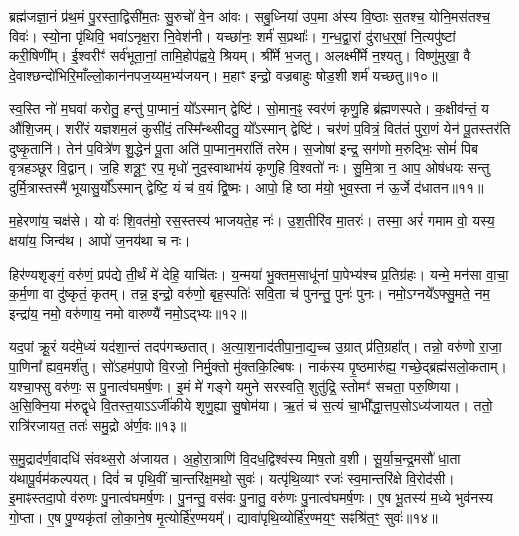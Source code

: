 ब्रह्म॑जज्ञा॒नं प्र॑थ॒मं पु॒रस्ता॒द्विसी॑म॒तः सु॒रुचो॑ वे॒न आ॑वः। 
सबु॒ध्निया॑ उप॒मा अ॑स्य वि॒ष्ठाः स॒तश्च॒ योनि॒मस॑तश्च॒ विवः॑। 
स्यो॒ना पृ॑थिवि॒ भवा॑ऽनृक्ष॒रा नि॒वेश॑नी। 
यच्छा॑नः॒ शर्म॑ स॒प्रथाः᳚। 
ग॒न्ध॒द्वा॒रां दु॑राध॒र्॒‌षां॒ नि॒त्यपु॑ष्टां करी॒षिणी᳚म्। 
ई॒श्वरीꣳ॑ सर्व॑भूता॒नां॒ तामि॒होप॑ह्वये॒ श्रियम्। 
श्री᳚र्मे भ॒जतु। 
अलक्ष्मी᳚र्मे न॒श्यतु। 
विष्णु॑मुखा॒ वै दे॒वाश्छन्दो॑भिरि॒माँल्लो॒कान॑नप\-ज॒य्यम॒भ्य॑जयन्। 
म॒हाꣳ इन्द्रो॒ वज्रबाहुः षोड॒शी शर्म॑ यच्छतु॥१०॥

 स्व॒स्ति नो॑ म॒घवा॑ करोतु॒ हन्तु॑ पा॒प्मानं॒ यो᳚ऽस्मान् द्वेष्टि॑। 
 सो॒मान॒ꣴ॒ स्वर॑णं कृणु॒हि ब्र॑ह्मणस्पते। 
 क॒क्षीव॑न्तं॒ य औ॑शि॒जम्। 
 शरी॑रं यज्ञशम॒लं कुसी॑दं॒ तस्मि᳚न्थ्सीदतु॒ यो᳚ऽस्मान् द्वेष्टि॑। 
 चर॑णं प॒वित्रं॒ वित॑तं पुरा॒णं येन॑ पू॒तस्तर॑ति दुष्कृ॒तानि॑। 
 तेन॑ प॒वित्रे॑ण शु॒द्धेन॑ पू॒ता अति॑ पा॒प्मान॒मरा॑तिं तरेम। 
 स॒जोषा॑ इन्द्र॒ सग॑णो म॒रुद्भिः॒ सोमं॑ पिब वृत्रहञ्छूर वि॒द्वान्। 
 ज॒हि शत्रू॒ꣳ॒ रप॒ मृधो॑ नुद॒स्वाथाभ॑यं कृणुहि वि॒श्वतो॑ नः। 
 सु॒मि॒त्रा न॒ आप॒ ओष॑धयः सन्तु दुर्मि॒त्रास्तस्मै॑ भूयासु॒र्यो᳚ऽस्मान् द्वेष्टि॒ यं च॑ व॒यं द्वि॒ष्मः। 
 आपो॒ हि ष्ठा म॑यो॒ भुव॒स्ता न॑ ऊ॒र्जे द॑धातन॥११॥
 
 म॒हेरणा॑य॒ चक्ष॑से। 
 यो वः॑ शि॒वत॑मो॒ रस॒स्तस्य॑ भाजयते॒ह नः॑। 
 उ॒श॒तीरि॑व मा॒तरः॑। 
 तस्मा॒ अरं॑ गमाम वो॒ यस्य॒ क्षया॑य॒ जिन्व॑थ। 
 आपो॑ ज॒नय॑था च नः।

 
हिर॑ण्यशृङ्गं॒ वरु॑णं॒ प्रप॑द्ये ती॒र्थं मे॑ देहि॒ याचि॑तः। 
य॒न्मया॑ भु॒क्तम॒साधू॑नां पा॒पेभ्य॑श्च प्र॒तिग्र॑हः। 
यन्मे॒ मन॑सा वा॒चा॒ क॒र्म॒णा वा दु॑ष्कृतं॒ कृतम्। 
तन्न॒ इन्द्रो॒ वरु॑णो॒ बृह॒स्पतिः॑ सवि॒ता च॑ पुनन्तु॒ पुनः॑ पुनः। 
नमो॒ऽग्नये᳚ऽफ्सु॒मते॒ नम॒ इन्द्रा॑य॒ नमो॒ वरु॑णाय॒ नमो वारुण्यै॑ नमो॒ऽद्भ्यः॥१२॥

 यद॒पां क्रू॒रं यद॑मे॒ध्यं यद॑शा॒न्तं तदप॑गच्छतात्। 
 अ॒त्या॒श॒नाद॑ती\-पा॒ना॒द्य॒च्च उ॒ग्रात् प्र॑ति॒ग्रहा᳚त्। 
 तन्नो॒ वरु॑णो रा॒जा॒ पा॒णिना᳚ ह्यव॒मर्\mbox{}श॑तु। 
 सो॑ऽहम॑पा॒पो वि॒रजो॒ निर्मु॒क्तो मु॑क्तकि॒ल्बिषः। 
 नाक॑स्य पृ॒ष्ठमारु॑ह्य॒ गच्छे॒द्ब्रह्म॑सलो॒कताम्। 
 यश्चा॒फ्सु वरु॑णः॒ स पु॒नात्व॑घमर्\mbox{}ष॒णः। 
 इ॒मं मे॑ गङ्गे यमुने सरस्वति॒ शुतु॑द्रि॒ स्तोमꣳ॑ सचता॒ परु॒ष्णिया। 
 अ॒सि॒क्नि॒या म॑रुद्\mbox{}वृधे वि॒तस्त॒याऽऽर्जी॑कीये शृणु॒ह्या सु॒षोम॑या। 
 ऋ॒तं च॑ स॒त्यं चा॒भी᳚द्धा॒त्तप॒सोऽध्य॑जायत। 
 ततो॒ रात्रि॑रजायत॒ ततः॑ समु॒द्रो अ॑र्ण॒वः॥१३॥
 
 स॒मु॒द्राद॑र्ण॒वादधि॑ संवथ्स॒रो अ॑जायत। 
 अ॒हो॒रा॒त्राणि॑ वि॒दध॒द्विश्व॑स्य मिष॒तो व॒शी। 
 सू॒र्या॒च॒न्द्र॒मसौ॑ धा॒ता य॑थापू॒र्वम॑\-कल्प\-यत्। 
 दिवं॑ च पृथि॒वीं चा॒न्तरि॑क्ष॒मथो॒ सुवः॑। 
 यत्पृ॑थि॒व्याꣳ रजः॑ स्व॒मान्तरि॑क्षे वि॒रोद॑सी। 
 इ॒माꣴस्तदा॒पो व॑रुणः पु॒नात्व॑घमर्\mbox{}ष॒णः। 
 पु॒नन्तु॒ वस॑वः पु॒नातु॒ वरु॑णः पु॒नात्व॑घमर्\mbox{}ष॒णः। 
 ए॒ष भू॒तस्य॑ म॒ध्ये भुव॑नस्य गो॒प्ता। 
 ए॒ष पु॒ण्यकृ॑तां लो॒का॒ने॒ष मृ॒त्योर्\mbox{}हि॑र॒ण्मयम्᳚। 
 द्यावा॑पृथि॒व्योर्\mbox{}हि॑र॒ण्मय॒ꣳ॒ सꣴश्रि॑त॒ꣳ॒ सुवः॑॥१४॥

